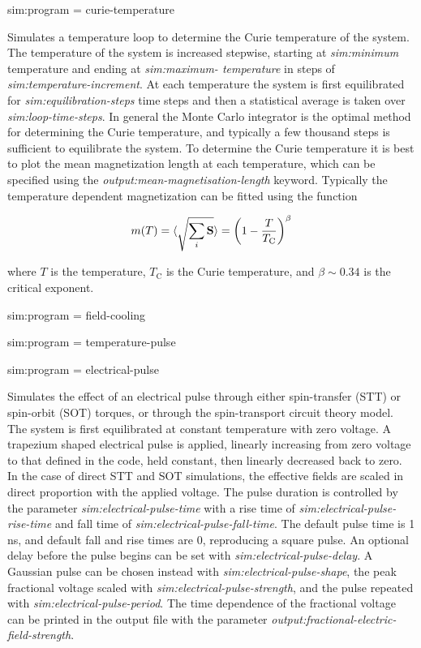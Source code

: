 {\zicf sim:program = curie-temperature} Simulates a temperature loop to determine the Curie temperature of the system. The temperature of the system is increased stepwise, starting at \textit{sim:minimum} temperature and ending at \textit{sim:maximum- temperature} in steps of \textit{sim:temperature-increment}. At each temperature the system is first equilibrated for \textit{sim:equilibration-steps} time steps and then a statistical average is taken over \textit{sim:loop-time-steps}. In general the Monte Carlo integrator is the optimal method for determining the Curie temperature, and typically a few thousand steps is sufficient to equilibrate the system. To determine the Curie temperature it is best to plot the mean magnetization length at each temperature, which can be specified using the \textit{output:mean-magnetisation-length} keyword. Typically the temperature dependent magnetization can be fitted using the function

\begin{equation}
m(T) = \langle{\sqrt{\sum_i \mathbf{S}}}\rangle = \left(1 - \frac{T}{T_{\mathrm{C}}} \right)^{\beta}
\end{equation}

\noindent where $T$ is the temperature, $T_{\mathrm{C}}$ is the Curie temperature, and $\beta \sim 0.34$ is the critical exponent.

{\zicf sim:program = field-cooling}

{\zicf sim:program = temperature-pulse}

{\zicf sim:program = electrical-pulse}
Simulates the effect of an electrical pulse through either spin-transfer (STT) or
spin-orbit (SOT) torques, or through the spin-transport circuit theory model. The
system is first equilibrated at constant temperature with zero voltage. A
trapezium shaped electrical pulse is applied, linearly increasing from zero
voltage to that defined in the code, held constant, then linearly decreased back
to zero. In the case of direct STT and SOT simulations, the effective fields are
scaled in direct proportion with the applied voltage. The pulse duration is
controlled by the parameter \textit{sim:electrical-pulse-time}
with a rise time of \textit{sim:electrical-pulse-rise-time} and fall time of
\textit{sim:electrical-pulse-fall-time}. The default pulse time is 1 ns, and
default fall and rise times are 0, reproducing a square pulse. An optional delay
before the pulse begins can be set with \textit{sim:electrical-pulse-delay}. A Gaussian
pulse can be chosen instead with \textit{sim:electrical-pulse-shape}, the peak fractional
voltage scaled with \textit{sim:electrical-pulse-strength}, and the pulse repeated with
\textit{sim:electrical-pulse-period}. The time
dependence of the fractional voltage can be printed in the output file with the
parameter \textit{output:fractional-electric-field-strength}.


